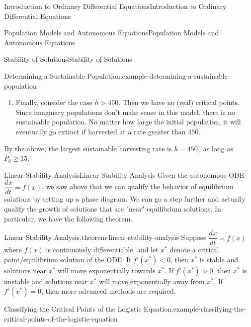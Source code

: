 \documentclass[10pt,]{book}
\newcommand{\terminology}[1]{\textbf{#1}}
\numberwithin{equation}{section}
\newcommand{\dv}[3][]{\dfrac{d^{#1} #2}{d #3^{#1}}}
\newcommand{\lt}{<}
\newcommand{\gt}{>}
\begin{document}
\begin{chapterptx}{Introduction to Ordinary Differential Equations}{}{Introduction to Ordinary Differential Equations}{}{}
\begin{sectionptx}{Population Models and Autonomous Equations}{}{Population Models and Autonomous Equations}{}{}
\begin{subsectionptx}{Stability of Solutions}{}{Stability of Solutions}{}{}
\begin{example}{Determining a Sustainable Population.}{example-determining-a-sustainable-population}
\begin{enumerate}
\begin{figure}
{
}
\end{figure}
\hypertarget{p-134}{}%
We interpret the phase diagram as follows: if \(P\) is less than \hypertarget{p-135}{}%
15,000%
 then the population will collapse to extinction. Otherwise, the population will stabilize at \(15,000\). This type of critical point is often called \terminology{semi-stable.}%
\item\hypertarget{li-13}{}\hypertarget{p-136}{}%
Finally, consider the case \(h \gt 450\). Then we have no (real) critical points. Since imaginary populations don't make sense in this model, there is no sustainable population. No matter how large the initial population, it will eventually go extinct if harvested at a rate greater than \(450\).%
\end{enumerate}
\hypertarget{p-137}{}%
By the above, the largest sustainable harvesting rate is \(h = 450,\) as long as \(P_{0}\geq 15\).%
\end{example}
\end{subsectionptx}
%
%
\typeout{************************************************}
\typeout{************************************************}
%
\begin{subsectionptx}{Linear Stability Analysis}{}{Linear Stability Analysis}{}{}\label{subsection-linear-stability-analysis}
\hypertarget{p-138}{}%
Given the autonomous ODE \(\dv{x}{t} = f(x)\), we saw above that we can qualify the behavior of equilibrium solutions by setting up a phase diagram. We can go a step further and actually qualify the growth of solutions that are "near" equilibrium solutions. In particular, we have the following theorem.%
\begin{theorem}{Linear Stability Analysis.}{}{theorem-linear-stability-analysis}%
\hypertarget{p-139}{}%
Suppose \(\dv{x}{t} = f(x)\) where \(f(x)\) is continuously differentiable, and let \(x^{*}\) denote a critical point/equilibrium solution of the ODE. If \(f'(x^{*}) \lt 0\), then \(x^{*}\) is stable and solutions near \(x^{*}\) will move exponentially towards \(x^{*}\). If \(f'(x^{*}) \gt 0\), then \(x^{*}\) is unstable and solutions near \(x^{*}\) will move exponentially away from \(x^{*}\). If \(f'(x^{*}) = 0\), then more advanced methods are required.%
\end{theorem}
\begin{example}{Classifying the Critical Points of the Logistic Equation.}{example-classifying-the-critical-points-of-the-logistic-equation}%

\end{example}
\end{subsectionptx}
\end{sectionptx}
\end{chapterptx}
\end{document}
